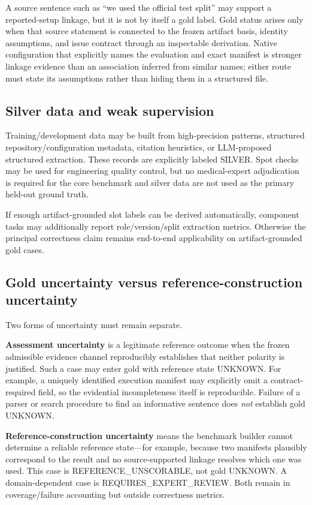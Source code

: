 \documentclass[11pt,a4paper]{article}
\newcommand{\status}[1]{\textsf{\small #1}}
\begin{document}
A source sentence such as ``we used the official test split'' may support a reported-setup linkage, but it is not by itself a gold label. Gold status arises only when that source statement is connected to the frozen artifact basis, identity assumptions, and issue contract through an inspectable derivation. Native configuration that explicitly names the evaluation and exact manifest is stronger linkage evidence than an association inferred from similar names; either route must state its assumptions rather than hiding them in a structured file.

\subsection{Silver data and weak supervision}
Training/development data may be built from high-precision patterns, structured repository/configuration metadata, citation heuristics, or LLM-proposed structured extraction. These records are explicitly labeled \status{SILVER}. Spot checks may be used for engineering quality control, but no medical-expert adjudication is required for the core benchmark and silver data are not used as the primary held-out ground truth.

If enough artifact-grounded slot labels can be derived automatically, component tasks may additionally report role/version/split extraction metrics. Otherwise the principal correctness claim remains end-to-end applicability on artifact-grounded gold cases.

\subsection{Gold uncertainty versus reference-construction uncertainty}
Two forms of uncertainty must remain separate.

\textbf{Assessment uncertainty} is a legitimate reference outcome when the frozen admissible evidence channel reproducibly establishes that neither polarity is justified. Such a case may enter gold with reference state \status{UNKNOWN}. For example, a uniquely identified execution manifest may explicitly omit a contract-required field, so the evidential incompleteness itself is reproducible. Failure of a parser or search procedure to find an informative sentence does \emph{not} establish gold \status{UNKNOWN}.

\textbf{Reference-construction uncertainty} means the benchmark builder cannot determine a reliable reference state---for example, because two manifests plausibly correspond to the result and no source-supported linkage resolves which one was used. This case is \status{REFERENCE\_UNSCORABLE}, not gold \status{UNKNOWN}. A domain-dependent case is \status{REQUIRES\_EXPERT\_REVIEW}. Both remain in coverage/failure accounting but outside correctness metrics.
\end{document}

